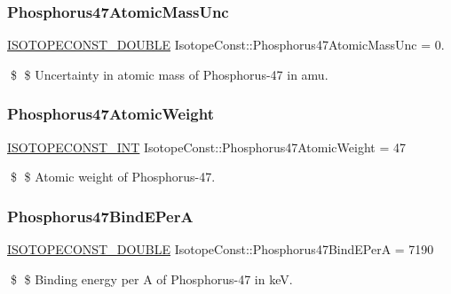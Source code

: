 \subsubsection{\texorpdfstring{Phosphorus47\+Atomic\+Mass\+Unc}{Phosphorus47AtomicMassUnc}}
{\footnotesize\ttfamily \mbox{\hyperlink{group___isotope_const-_macros_ga8f45a7272ce02c0b4c65c44636ed719a}{I\+S\+O\+T\+O\+P\+E\+C\+O\+N\+S\+T\+\_\+\+D\+O\+U\+B\+LE}} Isotope\+Const\+::\+Phosphorus47\+Atomic\+Mass\+Unc = 0.}

\$ \$ Uncertainty in atomic mass of Phosphorus-\/47 in amu. \mbox{\label{group___isotope_const-_phosphorus-_p47_ga4714a952ccbc9717037d01e8061c7f2b}} 
\subsubsection{\texorpdfstring{Phosphorus47\+Atomic\+Weight}{Phosphorus47AtomicWeight}}
{\footnotesize\ttfamily \mbox{\hyperlink{group___isotope_const-_macros_ga5f18360b3e99483a35c32d789e62621c}{I\+S\+O\+T\+O\+P\+E\+C\+O\+N\+S\+T\+\_\+\+I\+NT}} Isotope\+Const\+::\+Phosphorus47\+Atomic\+Weight = 47}

\$ \$ Atomic weight of Phosphorus-\/47. \mbox{\label{group___isotope_const-_phosphorus-_p47_ga1f2de5a063b216094a929714350e7340}} 
\subsubsection{\texorpdfstring{Phosphorus47\+Bind\+E\+PerA}{Phosphorus47BindEPerA}}
{\footnotesize\ttfamily \mbox{\hyperlink{group___isotope_const-_macros_ga8f45a7272ce02c0b4c65c44636ed719a}{I\+S\+O\+T\+O\+P\+E\+C\+O\+N\+S\+T\+\_\+\+D\+O\+U\+B\+LE}} Isotope\+Const\+::\+Phosphorus47\+Bind\+E\+PerA = 7190}

\$ \$ Binding energy per A of Phosphorus-\/47 in keV. \mbox{\label{group___isotope_const-_phosphorus-_p47_ga5ceab47dc3d4f2844dd989d5f877078d}} 
